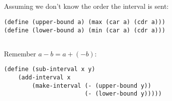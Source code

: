 \documentclass{article}
\begin{document}
\subsection{}
Assuming we don't know the order the interval is sent:
\begin{verbatim}
(define (upper-bound a) (max (car a) (cdr a))) 
(define (lower-bound a) (min (car a) (cdr a))) 
\end{verbatim}
\subsection{}
Remember $a-b=a+(-b)$:
\begin{verbatim}
(define (sub-interval x y)
    (add-interval x 
        (make-interval (- (upper-bound y)) 
                       (- (lower-bound y))))) 
\end{verbatim}
\subsection{}
\end{document}
